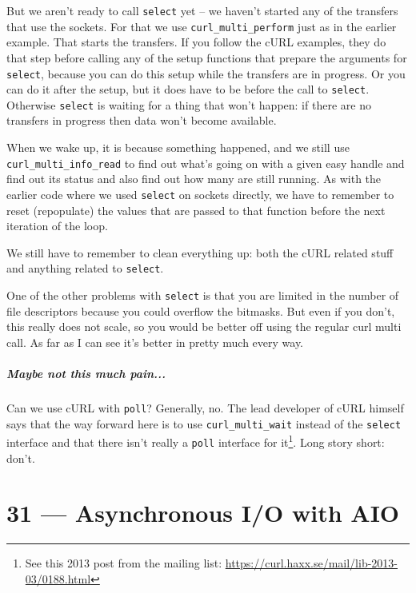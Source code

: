 \documentclass[a4paper]{report}
\begin{document}
But we aren't ready to call \texttt{select} yet -- we haven't started any of the transfers  that use the sockets. For that we use \texttt{curl\_multi\_perform} just as in the earlier example. That starts the transfers. If you follow the cURL examples, they do that step before calling any of the setup functions that prepare the arguments for \texttt{select}, because you can do this setup while the transfers are in progress. Or you can do it after the setup, but it does have to be before the call to \texttt{select}. Otherwise \texttt{select} is waiting for a thing that won't happen: if there are no transfers in progress then data won't become available.

When we wake up, it is because something happened, and we still use \texttt{curl\_multi\_info\_read} to find out what's going on with a given easy handle and find out its status and also find out how many are still running. As with the earlier code where we used \texttt{select} on sockets directly, we have to remember to reset (repopulate) the values that are passed to that function before the next iteration of the loop.

We still have to remember to clean everything up: both the cURL related stuff and anything related to \texttt{select}.

One of the other problems with \texttt{select} is that you are limited in the number of file descriptors because you could overflow the bitmasks. But even if you don't, this really does not scale, so you would be better off using the regular curl multi call. As far as I can see it's better in pretty much every way.

\paragraph{Maybe not this much pain...} Can we use cURL with \texttt{poll}? Generally, no. The lead developer of cURL himself says that the way forward here is to use \texttt{curl\_multi\_wait} instead of the \texttt{select} interface and that there isn't really a \texttt{poll} interface for it\footnote{See this 2013 post from the mailing list: \url{https://curl.haxx.se/mail/lib-2013-03/0188.html}}. Long story short: don't.









\chapter*{31 --- Asynchronous I/O with AIO}
\end{document}
